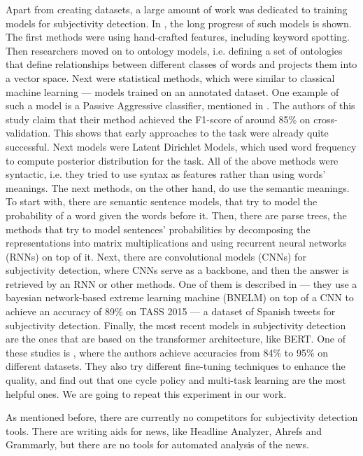 \documentclass[conference]{IEEEtran}
\begin{document}
Apart from creating datasets, a large amount of work was dedicated to training models for subjectivity detection. In \cite{survey}, the long progress of such models is shown. The first methods were using hand-crafted features, including keyword spotting. Then researchers moved on to ontology models, i.e. defining a set of ontologies that define relationships between different classes of words and projects them into a vector space. Next were statistical methods, which were similar to classical machine learning --- models trained on an annotated dataset. One example of such a model is a Passive Aggressive classifier, mentioned in \cite{fact-opinion-classifier}. The authors of this study claim that their method achieved the F1-score of around 85\% on cross-validation. This shows that early approaches to the task were already quite successful. Next models were Latent Dirichlet Models, which used word frequency to compute posterior distribution for the task. All of the above methods were syntactic, i.e. they tried to use syntax as features rather than using words' meanings. The next methods, on the other hand, do use the semantic meanings. To start with, there are semantic sentence models, that try to model the probability of a word given the words before it. Then, there are parse trees, the methods that try to model sentences' probabilities by decomposing the representations into matrix multiplications and using recurrent neural networks (RNNs) on top of it. Next, there are convolutional models (CNNs) for subjectivity detection, where CNNs serve as a backbone, and then the answer is retrieved by an RNN or other methods. One of them is described in \cite{bnelm} --- they use a bayesian network-based extreme learning machine (BNELM) on top of a CNN to achieve an accuracy of 89\% on TASS 2015 --- a dataset of Spanish tweets for subjectivity detection. Finally, the most recent models in subjectivity detection are the ones that are based on the transformer architecture, like BERT. One of these studies is \cite{bert-finetune}, where the authors achieve accuracies from 84\% to 95\% on different datasets. They also try different fine-tuning techniques to enhance the quality, and find out that one cycle policy and multi-task learning are the most helpful ones. We are going to repeat this experiment in our work.

As mentioned before, there are currently no competitors for subjectivity detection tools. There are writing aids for news, like Headline Analyzer, Ahrefs and Grammarly, but there are no tools for automated analysis of the news.
\end{document}
